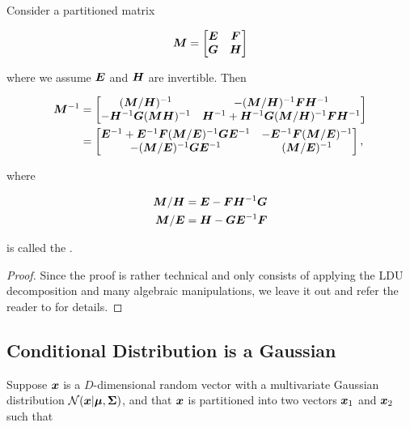 \begin{thm} Consider a partitioned matrix

  \begin{equation}
    {\bm{M}} = \begin{bmatrix} {\bm{E}} & {\bm{F}} \\ {\bm{G}} & {\bm{H}} \end{bmatrix}
  \end{equation}

  where we assume ${\bm{E}}$ and ${\bm{H}}$ are invertible. Then

  \begin{align}
    {\bm{M}}^{-1} &= \begin{bmatrix}
      ({\bm{M}} / {\bm{H}})^{-1} & -({\bm{M}} / {\bm{H}})^{-1} {\bm{F}} {\bm{H}}^{-1} \\
      -{\bm{H}}^{-1} {\bm{G}} ({\bm{M}} {\bm{H}})^{-1} & {\bm{H}}^{-1} + {\bm{H}}^{-1} {\bm{G}} ({\bm{M}} / {\bm{H}})^{-1} {\bm{F}} {\bm{H}}^{-1}
    \end{bmatrix} \\
             &= \begin{bmatrix}
      {\bm{E}}^{-1} + {\bm{E}}^{-1} {\bm{F}} ({\bm{M}} / {\bm{E}})^{-1} {\bm{G}} {\bm{E}}^{-1} & - {\bm{E}}^{-1} {\bm{F}} ({\bm{M}} / {\bm{E}})^{-1} \\
      -({\bm{M}} / {\bm{E}})^{-1} {\bm{G}} {\bm{E}}^{-1} & ({\bm{M}} / {\bm{E}})^{-1}
    \end{bmatrix},
    \label{eq:matrix-inversion-lemma}
  \end{align}

  where

  \begin{align}
    {\bm{M}} / {\bm{H}} &= {\bm{E}} - {\bm{F}} {\bm{H}}^{-1} {\bm{G}} \\
    {\bm{M}} / {\bm{E}} &= {\bm{H}} - {\bm{G}} {\bm{E}}^{-1} {\bm{F}}
  \end{align}

  is called the .
\end{thm}

\begin{proof}
  Since the proof is rather technical and only consists of applying the
  LDU decomposition and many algebraic manipulations, we leave it out and
  refer the reader to \cite{murphy2012machine} for details.
\end{proof}


\subsection{Conditional Distribution is a Gaussian}

Suppose ${\boldsymbol{x}}$ is a $D$-dimensional random vector with a multivariate Gaussian distribution
${\mathcal{N}}({\boldsymbol{x}} | {\boldsymbol{\mu}}, {\bm{\Sigma}})$, and that ${\boldsymbol{x}}$ is partitioned into two vectors
${\boldsymbol{x}}_1$ and ${\boldsymbol{x}}_2$ such that

